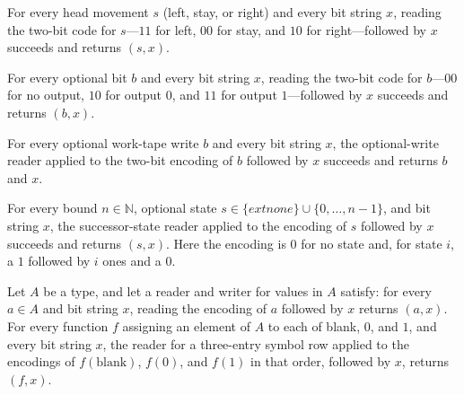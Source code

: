 \begin{lemma}
\label{Turing.codeReadSign_append}
\leanok
{}
For every head movement $s$ (left, stay, or right) and every bit string $x$, reading the
two-bit code for $s$—$11$ for left, $00$ for stay, and $10$ for right—followed by $x$
succeeds and returns $(s,x)$.
\end{lemma}

\begin{lemma}
\label{Turing.codeReadOutput_append}
\leanok
{}
For every optional bit $b$ and every bit string $x$, reading the two-bit code for
$b$—$00$ for no output, $10$ for output $0$, and $11$ for output $1$—followed by $x$
succeeds and returns $(b,x)$.
\end{lemma}

\begin{lemma}
\label{Turing.codeReadWrite_append}
\leanok
{}
For every optional work-tape write $b$ and every bit string $x$, the optional-write
reader applied to the two-bit encoding of $b$ followed by $x$ succeeds and returns $b$
and $x$.
\end{lemma}

\begin{lemma}
\label{Turing.codeReadState_append}
\leanok
{}
For every bound $n\in\mathbb N$, optional state
$s\in\{	ext{none}\}\cup\{0,\ldots,n-1\}$, and bit string $x$, the successor-state reader
applied to the encoding of $s$ followed by $x$ succeeds and returns $(s,x)$. Here the
encoding is $0$ for no state and, for state $i$, a $1$ followed by $i$ ones and a $0$.
\end{lemma}

\begin{lemma}
\label{Turing.codeReadSymbols_append}
\leanok
{}
Let $A$ be a type, and let a reader and writer for values in $A$ satisfy: for every
$a\in A$ and bit string $x$, reading the encoding of $a$ followed by $x$ returns
$(a,x)$. For every function $f$ assigning an element of $A$ to each of blank, $0$, and
$1$, and every bit string $x$, the reader for a three-entry symbol row applied to the
encodings of $f(\text{blank})$, $f(0)$, and $f(1)$ in that order, followed by $x$,
returns $(f,x)$.
\end{lemma}

